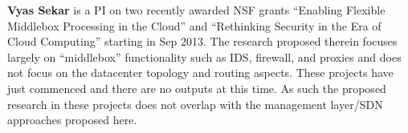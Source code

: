 \textbf{Vyas Sekar} is a PI on two recently awarded NSF grants ``Enabling
Flexible Middlebox Processing in the Cloud'' and ``Rethinking Security in the
Era of Cloud Computing'' starting in Sep 2013. The research proposed therein
focuses largely on ``middlebox'' functionality such as IDS, firewall, and
proxies and does not focus on the datacenter topology and routing aspects.
These projects have just commenced and there are no outputs at this time.  As
such the proposed research in these projects does not overlap with the
management layer/SDN approaches proposed here. 

